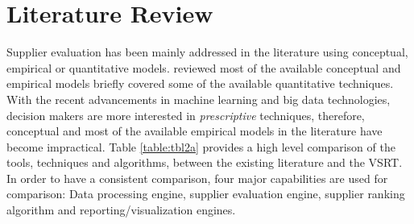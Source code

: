 \documentclass[inte,nonblindrev]{informs3} %
\begin{document}
\section{Literature Review}
Supplier evaluation has been mainly addressed in the literature using conceptual, empirical or quantitative models. \cite{r17} reviewed most of the available conceptual and empirical models briefly covered some of the available quantitative techniques. With the recent advancements in machine learning and big data technologies, decision makers are more interested in \textit{prescriptive} techniques, therefore, conceptual and most of the available empirical models in the literature have become impractical. Table \ref{table:tbl2a} provides a high level comparison of the tools, techniques and algorithms, between the existing literature and the VSRT. In order to have a consistent comparison, four major capabilities are used for comparison: Data processing engine, supplier evaluation engine, supplier ranking algorithm and reporting/visualization engines. 

\newcommand{\xmark}{\ding{55}}
\end{document}
